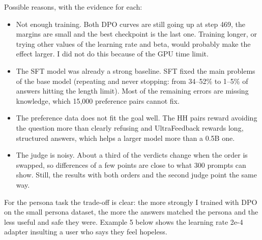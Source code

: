 \documentclass[11pt,a4paper]{article}
\begin{document}
\begin{table}[!htbp]
\centering
\begin{minipage}{0.48\linewidth}
\end{minipage}
\caption{DPO-UF vs.\ SFT by AlpacaEval source. Both answer orders are used and the win rate counts a tie as half a win.}
\label{tab:ufsrc}
\end{table}

\begin{table}[!htbp]
\centering
\begin{minipage}{0.62\linewidth}
\end{minipage}
\caption{Answer statistics with the same greedy decoding for all models. Refusal phrases are found with a simple keyword list.}
\label{tab:stats}
\end{table}

Possible reasons, with the evidence for each:
\begin{itemize}
\item Not enough training. Both DPO curves are still going up at step 469, the margins are small and the best checkpoint is the last one.
Training longer, or trying other values of the learning rate and beta, would probably make the effect larger. I did not do this because of the
GPU time limit.
\item The SFT model was already a strong baseline. SFT fixed the main problems of the base model (repeating and never stopping: from 34--52\%
to 1--5\% of answers hitting the length limit). Most of the remaining errors are missing knowledge, which 15,000 preference pairs cannot fix.
\item The preference data does not fit the goal well. The HH pairs reward avoiding the question more than clearly refusing and UltraFeedback
rewards long, structured answers, which helps a larger model more than a 0.5B one.
\item The judge is noisy. About a third of the verdicts change when the order is swapped, so differences of a few points are close to what 300
prompts can show. Still, the results with both orders and the second judge point the same way.
\end{itemize}

For the persona task the trade-off is clear: the more strongly I trained with DPO on the small persona dataset, the more the answers matched the
persona and the less useful and safe they were. Example 5 below shows the learning rate 2e-4 adapter insulting a user who says they feel hopeless.
\end{document}
